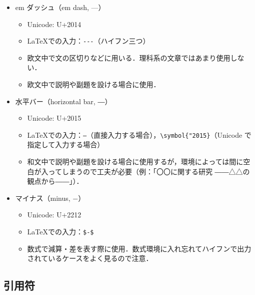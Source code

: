 \begin{itemize}
\begin{itemize}
    \end{itemize}
    \item em ダッシュ（em dash, ---）
    \begin{itemize}
        \item Unicode: U+2014
        \item \LaTeX での入力：\verb|---|（ハイフン三つ）
        \item 欧文中で文の区切りなどに用いる．理科系の文章ではあまり使用しない．
        \item 欧文中で説明や副題を設ける場合に使用．
    \end{itemize}
    \item 水平バー（horizontal bar, ―）
    \begin{itemize}
        \item Unicode: U+2015
        \item \LaTeX での入力：\verb|―|（直接入力する場合），\verb|\symbol{"2015}|（Unicode で指定して入力する場合）
        \item 和文中で説明や副題を設ける場合に使用するが，環境によっては間に空白が入ってしまうので工夫が必要（例：「〇〇に関する研究 ――△△の観点から――」）．
    \end{itemize}
    \item マイナス（minus, $-$）
    \begin{itemize}
        \item Unicode: U+2212
        \item \LaTeX での入力：\verb|$-$|
        \item 数式で減算・差を表す際に使用．数式環境に入れ忘れてハイフンで出力されているケースをよく見るので注意．
    \end{itemize}
\end{itemize}

\subsection*{引用符}
\label{ssec:quotation}

